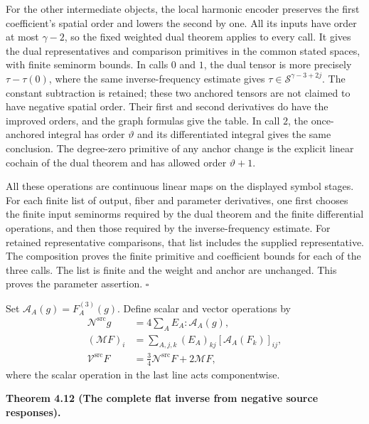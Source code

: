 \documentclass[
  english,
  11pt,
  reqno]{amsart}
\makeatletter
\newcommand{\pandocstatementheading}[1]{%
  \par\if@nobreak\else
    \addpenalty{\@beginparpenalty}%
    \addvspace{.5\baselineskip plus .2\baselineskip minus .2\baselineskip}%
  \fi
  {\normalfont\bfseries #1\par}%
  \nobreak\@afterindenttrue\@afterheading
}
\makeatother
\begin{document}
For the other intermediate objects, the local harmonic encoder preserves
the first coefficient's spatial order and lowers the second by one. All
its inputs have order at most \(\gamma-2\), so the fixed weighted dual
theorem applies to every call. It gives the dual representatives and
comparison primitives in the common stated spaces, with finite seminorm
bounds. In calls \(0\) and \(1\), the dual tensor is more precisely
\(\tau-\tau(0)\), where the same inverse-frequency estimate gives
\(\tau\in\mathscr S^{\gamma-3+2j}\). The constant subtraction is
retained; these two anchored tensors are not claimed to have negative
spatial order. Their first and second derivatives do have the improved
orders, and the graph formulas give the table. In call \(2\), the
once-anchored integral has order \(\vartheta\) and its differentiated
integral gives the same conclusion. The degree-zero primitive of any
anchor change is the explicit linear cochain of the dual theorem and has
allowed order \(\vartheta+1\).

All these operations are continuous linear maps on the displayed symbol
stages. For each finite list of output, fiber and parameter derivatives,
one first chooses the finite input seminorms required by the dual
theorem and the finite differential operations, and then those required
by the inverse-frequency estimate. For retained representative
comparisons, that list includes the supplied representative. The
composition proves the finite primitive and coefficient bounds for each
of the three calls. The list is finite and the weight and anchor are
unchanged. This proves the parameter assertion. \hfill\(\square\)

Set \(\mathcal A_A(g)=F_A^{(3)}(g)\). Define scalar and vector
operations by%
\[
\begin{aligned}
\mathcal N^{\mathrm{src}}g
&=4\sum_AE_A:\mathcal A_A(g),\\
(\mathcal MF)_i
&=\sum_{A,j,k}(E_A)_{kj}[\mathcal A_A(F_k)]_{ij},\\
\mathcal V^{\mathrm{src}}F
&=\frac34\mathcal N^{\mathrm{src}}F+2\mathcal MF,
\end{aligned}
\] where the scalar operation in the last line acts componentwise.

\pandocstatementheading{\leavevmode{}\label{thm:online-negative-response-flat-green}Theorem 4.12 (The complete flat inverse from negative source responses).}
\end{document}
